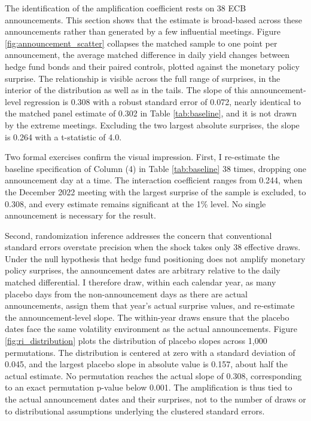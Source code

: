 \documentclass[english, 11pt, oneside]{article}
\begin{document}
The identification of the amplification coefficient rests on 38 ECB announcements. This section shows that the estimate is broad-based across these announcements rather than generated by a few influential meetings. Figure \ref{fig:announcement_scatter} collapses the matched sample to one point per announcement, the average matched difference in daily yield changes between hedge fund bonds and their paired controls, plotted against the monetary policy surprise. The relationship is visible across the full range of surprises, in the interior of the distribution as well as in the tails. The slope of this announcement-level regression is 0.308 with a robust standard error of 0.072, nearly identical to the matched panel estimate of 0.302 in Table \ref{tab:baseline}, and it is not drawn by the extreme meetings. Excluding the two largest absolute surprises, the slope is 0.264 with a t-statistic of 4.0.

Two formal exercises confirm the visual impression. First, I re-estimate the baseline specification of Column (4) in Table \ref{tab:baseline} 38 times, dropping one announcement day at a time. The interaction coefficient ranges from 0.244, when the December 2022 meeting with the largest surprise of the sample is excluded, to 0.308, and every estimate remains significant at the 1\% level. No single announcement is necessary for the result.

Second, randomization inference addresses the concern that conventional standard errors overstate precision when the shock takes only 38 effective draws. Under the null hypothesis that hedge fund positioning does not amplify monetary policy surprises, the announcement dates are arbitrary relative to the daily matched differential. I therefore draw, within each calendar year, as many placebo days from the non-announcement days as there are actual announcements, assign them that year's actual surprise values, and re-estimate the announcement-level slope. The within-year draws ensure that the placebo dates face the same volatility environment as the actual announcements. Figure \ref{fig:ri_distribution} plots the distribution of placebo slopes across 1,000 permutations. The distribution is centered at zero with a standard deviation of 0.045, and the largest placebo slope in absolute value is 0.157, about half the actual estimate. No permutation reaches the actual slope of 0.308, corresponding to an exact permutation p-value below 0.001. The amplification is thus tied to the actual announcement dates and their surprises, not to the number of draws or to distributional assumptions underlying the clustered standard errors. \\
\end{document}
